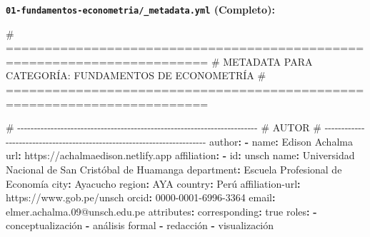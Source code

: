 \documentclass[
  doc,
  floatsintext,
  longtable,
  a4paper,
  nolmodern,
  notxfonts,
  notimes,
  12pt,
  colorlinks=true,linkcolor=blue,citecolor=blue,urlcolor=blue]{apa7}
\newenvironment{Shaded}{\begin{snugshade}}{\end{snugshade}}
\newcommand{\AttributeTok}[1]{\textcolor[rgb]{0.40,0.45,0.13}{#1}}
\newcommand{\CharTok}[1]{\textcolor[rgb]{0.13,0.47,0.30}{#1}}
\newcommand{\CommentTok}[1]{\textcolor[rgb]{0.37,0.37,0.37}{#1}}
\newcommand{\FunctionTok}[1]{\textcolor[rgb]{0.28,0.35,0.67}{#1}}
\newcommand{\KeywordTok}[1]{\textcolor[rgb]{0.00,0.23,0.31}{\textbf{#1}}}
\begin{document}
\textbf{\texttt{01-fundamentos-econometria/\_metadata.yml} (Completo):}

\begin{Shaded}
\begin{Highlighting}[]
\CommentTok{\# ========================================================================}
\CommentTok{\# METADATA PARA CATEGORÍA: FUNDAMENTOS DE ECONOMETRÍA}
\CommentTok{\# ========================================================================}

\CommentTok{\# {-}{-}{-}{-}{-}{-}{-}{-}{-}{-}{-}{-}{-}{-}{-}{-}{-}{-}{-}{-}{-}{-}{-}{-}{-}{-}{-}{-}{-}{-}{-}{-}{-}{-}{-}{-}{-}{-}{-}{-}{-}{-}{-}{-}{-}{-}{-}{-}{-}{-}{-}{-}{-}{-}{-}{-}{-}{-}{-}{-}{-}{-}{-}{-}{-}{-}{-}{-}{-}{-}{-}{-}}
\CommentTok{\# AUTOR}
\CommentTok{\# {-}{-}{-}{-}{-}{-}{-}{-}{-}{-}{-}{-}{-}{-}{-}{-}{-}{-}{-}{-}{-}{-}{-}{-}{-}{-}{-}{-}{-}{-}{-}{-}{-}{-}{-}{-}{-}{-}{-}{-}{-}{-}{-}{-}{-}{-}{-}{-}{-}{-}{-}{-}{-}{-}{-}{-}{-}{-}{-}{-}{-}{-}{-}{-}{-}{-}{-}{-}{-}{-}{-}{-}}
\FunctionTok{author}\KeywordTok{:}
\AttributeTok{  }\KeywordTok{{-}}\AttributeTok{ }\FunctionTok{name}\KeywordTok{:}\AttributeTok{ Edison Achalma}
\AttributeTok{    }\FunctionTok{url}\KeywordTok{:}\AttributeTok{ https://achalmaedison.netlify.app}
\AttributeTok{    }\FunctionTok{affiliation}\KeywordTok{:}
\AttributeTok{      }\KeywordTok{{-}}\AttributeTok{ }\FunctionTok{id}\KeywordTok{:}\AttributeTok{ unsch}
\AttributeTok{        }\FunctionTok{name}\KeywordTok{:}\AttributeTok{ Universidad Nacional de San Cristóbal de Huamanga}
\AttributeTok{        }\FunctionTok{department}\KeywordTok{:}\AttributeTok{ Escuela Profesional de Economía}
\AttributeTok{        }\FunctionTok{city}\KeywordTok{:}\AttributeTok{ Ayacucho}
\AttributeTok{        }\FunctionTok{region}\KeywordTok{:}\AttributeTok{ AYA}
\AttributeTok{        }\FunctionTok{country}\KeywordTok{:}\AttributeTok{ Perú}
\AttributeTok{    }\FunctionTok{affiliation{-}url}\KeywordTok{:}\AttributeTok{ https://www.gob.pe/unsch}
\AttributeTok{    }\FunctionTok{orcid}\KeywordTok{:}\AttributeTok{ 0000{-}0001{-}6996{-}3364}
\AttributeTok{    }\FunctionTok{email}\KeywordTok{:}\AttributeTok{ elmer.achalma.09@unsch.edu.pe}
\AttributeTok{    }\FunctionTok{attributes}\KeywordTok{:}
\AttributeTok{      }\FunctionTok{corresponding}\KeywordTok{:}\AttributeTok{ }\CharTok{true}
\AttributeTok{    }\FunctionTok{roles}\KeywordTok{:}
\AttributeTok{      }\KeywordTok{{-}}\AttributeTok{ conceptualización}
\AttributeTok{      }\KeywordTok{{-}}\AttributeTok{ análisis formal}
\AttributeTok{      }\KeywordTok{{-}}\AttributeTok{ redacción}
\AttributeTok{      }\KeywordTok{{-}}\AttributeTok{ visualización}


\end{Highlighting}
\end{Shaded}
\end{document}
